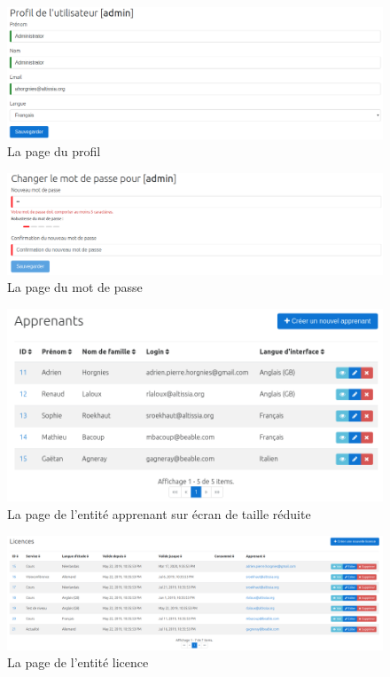 \begin{figure}[ht]
    \centering
    \includegraphics[width=1\textwidth]{images/screenshot/account-profile.png}
    \caption{La page du profil}
    \label{fig:account-profile}
\end{figure}

\begin{figure}[ht]
    \centering
    \includegraphics[width=1\textwidth]{images/screenshot/account-password.png}
    \caption{La page du mot de passe}
    \label{fig:account-password}
\end{figure}

\begin{figure}[ht]
    \centering
    \includegraphics[width=1\textwidth]{images/screenshot/entity-learners.png}
    \caption{La page de l'entité apprenant sur écran de taille réduite}
    \label{fig:entity-learner}
\end{figure}

\begin{figure}[ht]
    \centering
    \includegraphics[width=1\textwidth]{images/screenshot/entity-licenses.png}
    \caption{La page de l'entité licence}
    \label{fig:entity-license}
\end{figure}

